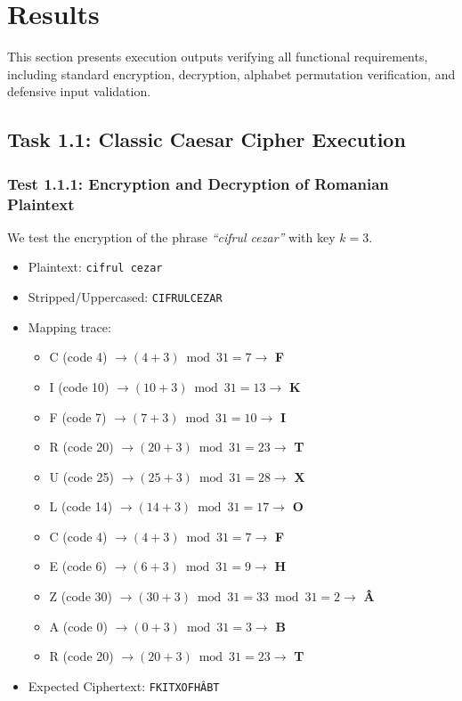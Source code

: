 \documentclass[12pt,a4paper]{article}
\begin{document}
\section{Results}

This section presents execution outputs verifying all functional requirements, including standard encryption, decryption, alphabet permutation verification, and defensive input validation.

\subsection{Task 1.1: Classic Caesar Cipher Execution}

\subsubsection{Test 1.1.1: Encryption and Decryption of Romanian Plaintext}
We test the encryption of the phrase \textit{``cifrul cezar''} with key $k = 3$.
\begin{itemize}
    \item Plaintext: \texttt{cifrul cezar}
    \item Stripped/Uppercased: \texttt{CIFRULCEZAR}
    \item Mapping trace:
    \begin{itemize}
        \item C (code 4) $\to (4+3) \bmod 31 = 7 \to$ \textbf{F}
        \item I (code 10) $\to (10+3) \bmod 31 = 13 \to$ \textbf{K}
        \item F (code 7) $\to (7+3) \bmod 31 = 10 \to$ \textbf{I}
        \item R (code 20) $\to (20+3) \bmod 31 = 23 \to$ \textbf{T}
        \item U (code 25) $\to (25+3) \bmod 31 = 28 \to$ \textbf{X}
        \item L (code 14) $\to (14+3) \bmod 31 = 17 \to$ \textbf{O}
        \item C (code 4) $\to (4+3) \bmod 31 = 7 \to$ \textbf{F}
        \item E (code 6) $\to (6+3) \bmod 31 = 9 \to$ \textbf{H}
        \item Z (code 30) $\to (30+3) \bmod 31 = 33 \bmod 31 = 2 \to$ \textbf{Â}
        \item A (code 0) $\to (0+3) \bmod 31 = 3 \to$ \textbf{B}
        \item R (code 20) $\to (20+3) \bmod 31 = 23 \to$ \textbf{T}
    \end{itemize}
    \item Expected Ciphertext: \texttt{FKITXOFHÂBT}
\end{itemize}
\end{document}
